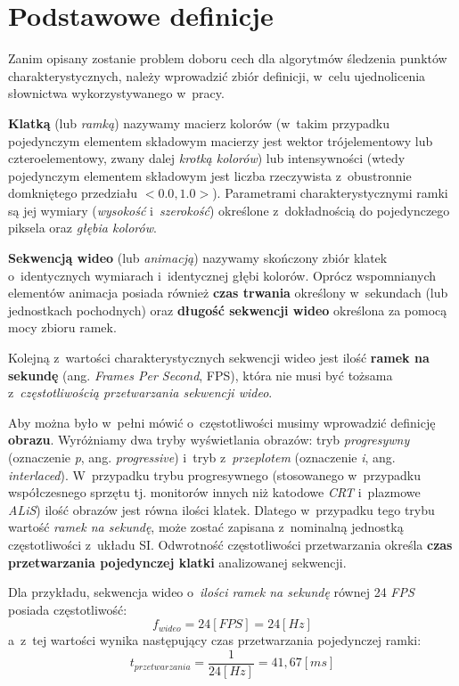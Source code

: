   \section{Podstawowe definicje}\label{Section_Definicje}
    Zanim opisany zostanie problem doboru cech dla algorytmów śledzenia punktów charakterystycznych, należy wprowadzić zbiór definicji, w~celu ujednolicenia słownictwa wykorzystywanego w~pracy.

    \textbf{Klatką} (lub \textit{ramką}) nazywamy macierz kolorów (w~takim przypadku pojedynczym elementem składowym macierzy jest wektor trójelementowy lub czteroelementowy, zwany dalej \textit{krotką kolorów}) lub intensywności (wtedy pojedynczym elementem składowym jest liczba rzeczywista z~obustronnie domkniętego przedziału $<0.0, 1.0>$). Parametrami charakterystycznymi ramki są jej wymiary (\textit{wysokość} i~\textit{szerokość}) określone z~dokładnością do pojedynczego piksela oraz \textit{głębia kolorów}.

    \textbf{Sekwencją wideo} (lub \textit{animacją}) nazywamy skończony zbiór klatek o~identycznych wymiarach i~identycznej głębi kolorów. Oprócz wspomnianych elementów animacja posiada również \textbf{czas trwania} określony w~sekundach (lub jednostkach pochodnych) oraz \textbf{długość sekwencji wideo} określona za pomocą mocy zbioru ramek.

    Kolejną z~wartości charakterystycznych sekwencji wideo jest ilość \textbf{ramek na sekundę} (ang. \textit{Frames Per Second}, FPS), która nie musi być tożsama z~\textit{częstotliwością przetwarzania sekwencji wideo}.

    Aby można było w~pełni mówić o~częstotliwości musimy wprowadzić definicję \textbf{obrazu}. Wyróżniamy dwa tryby wyświetlania obrazów: tryb \textit{progresywny} (oznaczenie \textit{p}, ang. \textit{progressive}) i~tryb z~\textit{przeplotem} (oznaczenie \textit{i}, ang. \textit{interlaced}). W~przypadku trybu progresywnego (stosowanego w~przypadku współczesnego sprzętu tj. monitorów innych niż katodowe \textit{CRT} i~plazmowe \textit{ALiS}) ilość obrazów jest równa ilości klatek. Dlatego w~przypadku tego trybu wartość \textit{ramek na sekundę}, może zostać zapisana z~nominalną jednostką częstotliwości z~układu SI. Odwrotność częstotliwości przetwarzania określa \textbf{czas przetwarzania pojedynczej klatki} analizowanej sekwencji.

    Dla przykładu, sekwencja wideo o~\textit{ilości ramek na sekundę} równej 24 \textit{FPS} posiada częstotliwość: \[ f_{wideo} = 24 [FPS] = 24 [Hz] \] a~z~tej wartości wynika następujący czas przetwarzania pojedynczej ramki: \[ t_{przetwarzania} = \frac{1}{24 [Hz]} = 41,67 [ms] \]

